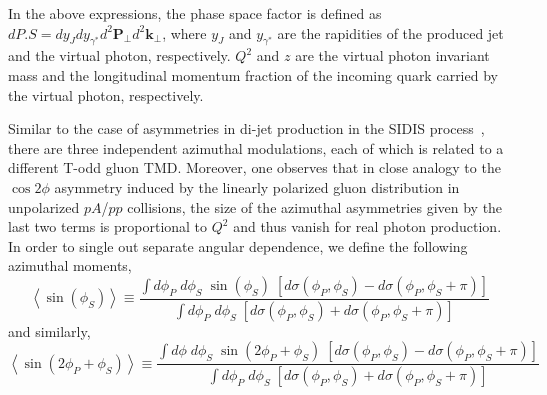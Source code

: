 \documentclass[prd,aps,preprintnumbers,fleqn,showpacs,nofootinbib,superscriptaddress]{revtex4}
\begin{document}
In the above expressions, the phase space factor is defined as $d P.S=dy_J dy_{\gamma^*} d^2\bm{P}_\perp
d^2 \bm{k}_\perp$, where $y_J$ and $ y_{\gamma^*}$ are the rapidities of the produced jet and the
virtual photon, respectively. $Q^2$ and $z$ are the virtual photon invariant mass and  the
longitudinal momentum fraction of the incoming quark carried by the virtual photon, respectively.

Similar to the case of asymmetries in di-jet production in the SIDIS process~\cite{Boer:2016fqd}, there are three independent azimuthal modulations, each of which is related to a different T-odd gluon TMD. Moreover, one observes that
in close analogy to the $\cos 2\phi$ asymmetry induced by the linearly polarized gluon distribution  in unpolarized $pA$/$pp$ collisions, the size of the azimuthal asymmetries given by the last two terms is proportional  to $Q^2$ and thus vanish for real photon production. In order to single out separate angular dependence,  we define the following azimuthal moments,  
 \begin{equation}
\left\langle \sin(\phi_S)\right\rangle
 \equiv
\frac{\int d \phi_P \; d\phi_S \;\sin
( \phi_S) \; \left[d \sigma(\phi_P, \phi_S) -
  d \sigma(\phi_P,\phi_S +\pi)\right] }{\int d \phi_P \; d\phi_S\;
\left[d \sigma(\phi_P, \phi_S) + d \sigma(\phi_P,\phi_S +\pi)\right] }
\end{equation}
and similarly,
\begin{equation}
\left\langle\sin(2 \phi_P+\phi_S) \right\rangle
 \equiv
\frac{\int d \phi \; d\phi_S \;\sin
(2 \phi_P+ \phi_S) \; \left[d \sigma(\phi_P, \phi_S) -
  d \sigma(\phi_P,\phi_S +\pi)\right] }{\int d \phi_P\; d\phi_S\;
\left[d \sigma(\phi_P, \phi_S) + d \sigma(\phi_P,\phi_S +\pi)\right] }
\end{equation}
\end{document}
